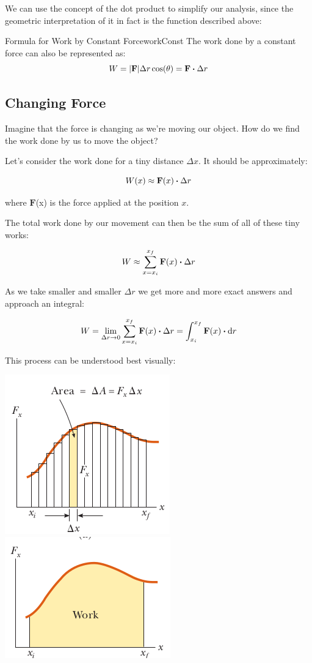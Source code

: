 \documentclass{report}
\begin{document}
We can use the concept of the dot product to simplify our analysis, since the geometric interpretation of it in fact is the function described above:


\begin{mytheo}{Formula for Work by Constant Force}{workConst}
    The work done by a constant force can also be represented as:
    $$W = |\mathbf{F}|\Delta r \cos(\theta) = \mathbf{F} \vdot \Delta r$$
\end{mytheo}


\subsection{Changing Force}

Imagine that the force is changing as we're moving our object. How do we find the work done by us to move the object?

Let's consider the work done for a tiny distance $\Delta x$. It should be approximately:

$$W(x) \approx \mathbf{F}(x) \vdot \Delta r$$

where $\mathbf{F}$(x) is the force applied at the position $x$.

The total work done by our movement can then be the sum of all of these tiny works:

$$W \approx \sum_{x=x_i}^{x_f}\mathbf{F}(x)\vdot \Delta r$$

As we take smaller and smaller $\Delta r$ we get more and more exact answers and approach an integral:

$$W = \lim_{\Delta r \to 0}\sum_{x=x_i}^{x_f}\mathbf{F}(x)\vdot \Delta r = \int_{x_i}^{x_f}\mathbf{F}(x)\vdot \dd r$$

This process can be understood best visually:

\includegraphics[scale=0.5]{work_area_a.png}
\includegraphics[scale=0.5]{work_area_b.png}
\end{document}
